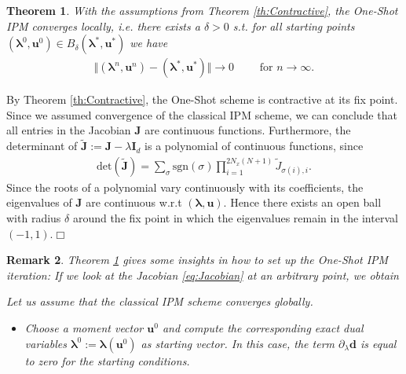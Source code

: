 \documentclass[10pt, a4paper, titlepage, bibliography=totocnumbered]{article}
\newtheorem{theorem}{Theorem}[section]
\newtheorem{remark}[theorem]{Remark}
\newenvironment{proof}[1][Proof]{\begin{trivlist}
\item[\hskip \labelsep {\bfseries #1}]}{\end{trivlist}}
\newcommand{\qed}{\hfill \ensuremath{\Box}}
\begin{document}
\begin{theorem}\label{th:localConvergence}
With the assumptions from Theorem \ref{th:Contractive}, the One-Shot IPM converges locally, i.e. there exists a $\delta>0$ s.t. for all starting points $(\bm{\lambda}^0,\bm{u}^0)\in B_{\delta}(\bm{\lambda}^*,\bm{u}^*)$ we have
\begin{align*}
\Vert (\bm{\lambda}^n,\bm{u}^n) - (\bm{\lambda}^*,\bm{u}^*)\Vert \rightarrow 0 \qquad \text{ for } n \rightarrow \infty.
\end{align*}
\end{theorem}
\begin{proof}
By Theorem \ref{th:Contractive}, the One-Shot scheme is contractive at its fix point. Since we assumed convergence of the classical IPM scheme, we can conclude that all entries in the Jacobian $\bm{J}$ are continuous functions. Furthermore, the determinant of $\bm{\tilde{J}}:=\bm{J}-\lambda \bm{I}_d$ is a polynomial of continuous functions, since
\begin{align*}
\text{det}(\bm{\tilde J}) = \sum_{\sigma} \text{sgn}(\sigma)\prod_{i = 1}^{2 N_x (N+1)} \tilde J_{\sigma(i),i}.
\end{align*}
Since the roots of a polynomial vary continuously with its coefficients, the eigenvalues of $\bm{J}$ are continuous w.r.t $(\bm{\lambda},\bm{u})$. Hence there exists an open ball with radius $\delta$ around the fix point in which the eigenvalues remain in the interval $(-1,1)$.\qed
\end{proof}
\begin{remark}
Theorem \ref{th:localConvergence} gives some insights in how to set up the One-Shot IPM iteration: If we look at the Jacobian \eqref{eq:Jacobian} at an arbitrary point, we obtain

Let us assume that the classical IPM scheme converges globally.

\begin{itemize}
\item Choose a moment vector $\bm{u}^0$ and compute the corresponding exact dual variables $\bm{\lambda}^0:=\bm{\lambda}(\bm{u}^0)$ as starting vector. In this case, the term $\partial_{\lambda}\bm{d}$ is equal to zero for the starting conditions.
\end{itemize}
\end{remark}
\end{document}
